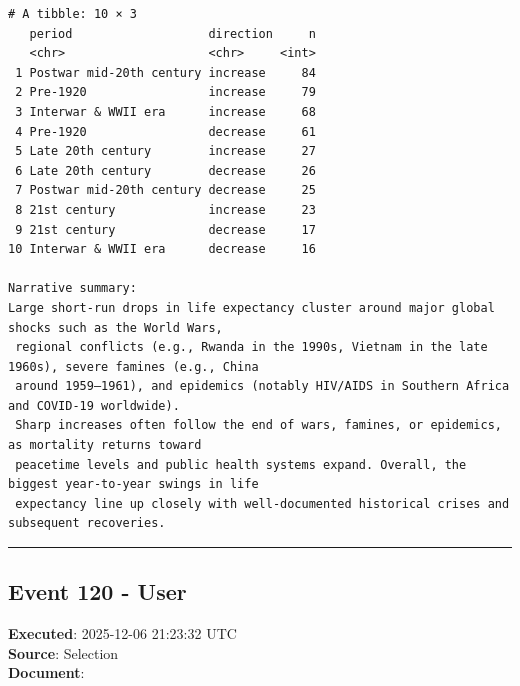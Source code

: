 \documentclass[
  11pt,
]{article}
\newenvironment{rpoutput}{\vspace{0.5em}\begin{snugshade}}{\end{snugshade}}
\begin{document}
\begin{rpoutput}

\begin{verbatim}
# A tibble: 10 × 3
   period                   direction     n
   <chr>                    <chr>     <int>
 1 Postwar mid-20th century increase     84
 2 Pre-1920                 increase     79
 3 Interwar & WWII era      increase     68
 4 Pre-1920                 decrease     61
 5 Late 20th century        increase     27
 6 Late 20th century        decrease     26
 7 Postwar mid-20th century decrease     25
 8 21st century             increase     23
 9 21st century             decrease     17
10 Interwar & WWII era      decrease     16

Narrative summary:
Large short-run drops in life expectancy cluster around major global shocks such as the World Wars,
 regional conflicts (e.g., Rwanda in the 1990s, Vietnam in the late 1960s), severe famines (e.g., China
 around 1959–1961), and epidemics (notably HIV/AIDS in Southern Africa and COVID-19 worldwide).
 Sharp increases often follow the end of wars, famines, or epidemics, as mortality returns toward
 peacetime levels and public health systems expand. Overall, the biggest year-to-year swings in life
 expectancy line up closely with well-documented historical crises and subsequent recoveries.
\end{verbatim}

\end{rpoutput}

\begin{center}\rule{0.5\linewidth}{0.5pt}\end{center}

\subsection{Event 120 - User}\label{event-120---user}

\textbf{Executed}: 2025-12-06 21:23:32 UTC\\
\textbf{Source}: Selection\\
\textbf{Document}:
\end{document}
